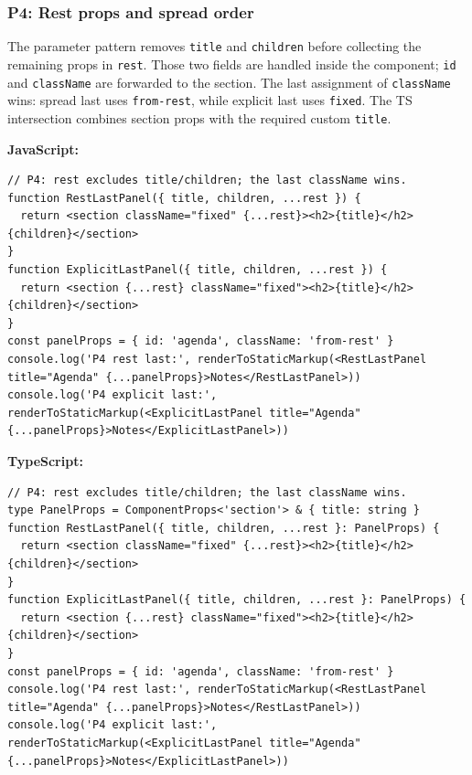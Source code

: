 \documentclass[
  11pt,
]{article}
\newcommand{\passthrough}[1]{#1}
\begin{document}
\subsubsection{P4: Rest props and spread
order}\label{p4-rest-props-and-spread-order}

The parameter pattern removes \passthrough{\lstinline!title!} and
\passthrough{\lstinline!children!} before collecting the remaining props
in \passthrough{\lstinline!rest!}. Those two fields are handled inside
the component; \passthrough{\lstinline!id!} and
\passthrough{\lstinline!className!} are forwarded to the section. The
last assignment of \passthrough{\lstinline!className!} wins: spread last
uses \passthrough{\lstinline!from-rest!}, while explicit last uses
\passthrough{\lstinline!fixed!}. The TS intersection combines section
props with the required custom \passthrough{\lstinline!title!}.

\textbf{JavaScript:}

\begin{lstlisting}
// P4: rest excludes title/children; the last className wins.
function RestLastPanel({ title, children, ...rest }) {
  return <section className="fixed" {...rest}><h2>{title}</h2>{children}</section>
}
function ExplicitLastPanel({ title, children, ...rest }) {
  return <section {...rest} className="fixed"><h2>{title}</h2>{children}</section>
}
const panelProps = { id: 'agenda', className: 'from-rest' }
console.log('P4 rest last:', renderToStaticMarkup(<RestLastPanel title="Agenda" {...panelProps}>Notes</RestLastPanel>))
console.log('P4 explicit last:', renderToStaticMarkup(<ExplicitLastPanel title="Agenda" {...panelProps}>Notes</ExplicitLastPanel>))
\end{lstlisting}

\textbf{TypeScript:}

\begin{lstlisting}
// P4: rest excludes title/children; the last className wins.
type PanelProps = ComponentProps<'section'> & { title: string }
function RestLastPanel({ title, children, ...rest }: PanelProps) {
  return <section className="fixed" {...rest}><h2>{title}</h2>{children}</section>
}
function ExplicitLastPanel({ title, children, ...rest }: PanelProps) {
  return <section {...rest} className="fixed"><h2>{title}</h2>{children}</section>
}
const panelProps = { id: 'agenda', className: 'from-rest' }
console.log('P4 rest last:', renderToStaticMarkup(<RestLastPanel title="Agenda" {...panelProps}>Notes</RestLastPanel>))
console.log('P4 explicit last:', renderToStaticMarkup(<ExplicitLastPanel title="Agenda" {...panelProps}>Notes</ExplicitLastPanel>))
\end{lstlisting}
\end{document}

